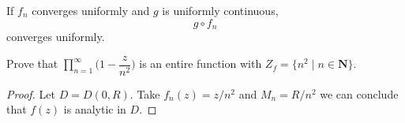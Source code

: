 \vspace{2ex}
\begin{lem}
If $f_{n}$ converges uniformly and $g$ is uniformly continuous,
\[g\circ f_{n}\]
converges uniformly.
\end{lem}
\vspace{2ex}
\begin{ex}
Prove that $\prod^{\infty }_{n=1}\Big(1-\dfrac{z}{n^2}\Big)$ is an entire function with $Z_{f}=\{n^2\;|\;n\in {\bm N}\}$. 
\end{ex}
\vspace{2ex}
\begin{proof}
Let $D=D(0,R)$. Take $f_{n}(z)=z/n^2$ and $M_{n}=R/n^2$ we can conclude that $f(z)$ is analytic in $D$. 
\end{proof}
\vspace{2ex}

